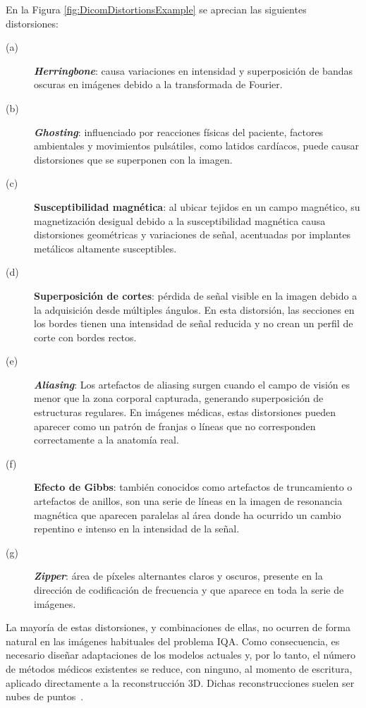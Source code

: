 En la Figura \ref{fig:DicomDistortionsExample} se aprecian las siguientes distorsiones:
\begin{description}
  \item[(a)] \textbf{\emph{Herringbone}}: causa variaciones en intensidad y superposición 
    de bandas oscuras en imágenes debido a la transformada de Fourier.
  \item[(b)] \textbf{\emph{Ghosting}}: influenciado por reacciones físicas del paciente, 
    factores ambientales y movimientos pulsátiles, como latidos cardíacos, 
    puede causar distorsiones que se superponen con la imagen.
  \item[(c)] \textbf{Susceptibilidad magnética}: al ubicar tejidos en un campo magnético, 
    su magnetización desigual debido a la susceptibilidad magnética causa 
    distorsiones geométricas y variaciones de señal, acentuadas por implantes 
    metálicos altamente susceptibles.
  \item[(d)] \textbf{Superposición de cortes}: pérdida de señal visible en la imagen 
    debido a la adquisición desde múltiples ángulos. 
    En esta distorsión, las secciones en los bordes tienen una intensidad de señal 
    reducida y no crean un perfil de corte con bordes rectos.
  \item[(e)] \textbf{\emph{Aliasing}}: Los artefactos de aliasing surgen cuando el campo 
    de visión es menor que la zona corporal capturada, generando superposición 
    de estructuras regulares. En imágenes médicas, estas distorsiones pueden 
    aparecer como un patrón de franjas o líneas que no corresponden 
    correctamente a la anatomía real.
  \item[(f)] \textbf{Efecto de Gibbs}: también conocidos como artefactos de truncamiento 
    o artefactos de anillos, son una serie de líneas en la imagen de resonancia 
    magnética que aparecen paralelas al área donde ha ocurrido un cambio repentino 
    e intenso en la intensidad de la señal.
  \item[(g)] \textbf{\emph{Zipper}}: área de píxeles alternantes claros y oscuros, presente en la dirección de codificación de frecuencia y que aparece en toda la serie de imágenes.
\end{description}
La mayoría de estas distorsiones, y combinaciones de ellas, no ocurren de forma natural 
en las imágenes habituales del problema IQA. Como consecuencia, es necesario diseñar 
adaptaciones de los modelos actuales y, por lo tanto, el número de métodos médicos 
existentes se reduce, con ninguno, al momento de escritura, aplicado directamente a la reconstrucción 3D. 
Dichas reconstrucciones suelen ser nubes de puntos~\cite{WhyUsePointCloud}. 

